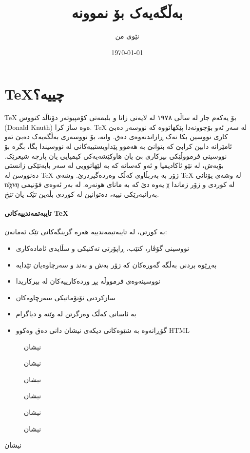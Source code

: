 \documentclass{article}
\title{بەڵگەیەک بۆ نموونە}
\author{نێوی من}
\date{\today}
\begin{document}
\maketitle

\section{\TeX چییە؟}

\TeX{} بۆ یەکەم جار لە ساڵی ١٩٧٨ لە لایەنی زانا و بلیمەتی کۆمپیوتەر
دۆناڵد کنووس (Donald Knuth) ەوە ساز کرا. \TeX{} لە سەر ئەو بۆچوونەدا
پێکهاتووە کە نووسەر دەبێ کاری نووسین بکا نەک ڕازاندنەوەی دەق. واتە، بۆ
نووسەری بەڵگەیەک دەبێ ئەو ئامێرانە دابین کرابێ کە بتوانێ بە هەموو
پێداویستییەکانی لە نووسیندا بگا، بگرە بۆ نووسینی فرمووڵێکی بیرکاری بێ
یان هاوکێشەیەکی کیمیایی یان پارچە شیعرێک. بۆیەش، لە نێو ئاکادیمیا و ئەو
کەسانه کە بە لێهاتوویی لە سەر بابەتێکی زانستی دەنووسن لە \TeX{} زۆر بە
بەربڵاوی کەڵک وەردەگیردرێ. وشەی \TeX{} لە وشەی یۆنانی \textit{τέχνη}
یەوە دێ کە بە مانای هونەرە. لە بەر ئەوەی فۆنیمی χ لە کوردی و زۆر زماندا
بەرانبەرێکی نییە، دەتوانین لە کوردی بڵەین \textit{تێک} یان
\textit{تێخ}.

\paragraph{تایبەتمەندییەکانی \TeX} بە کورتی، لە تایبەتیمەندییە هەرە
گرینگەکانی تێک ئەمانەن:
 
\begin{itemize}
\item نووسینی گۆڤار، کتێب، ڕاپۆرتی تەکنیکی و سڵایدی ئامادەکاری
\item بەڕێوە بردنی بەڵگە گەورەکان کە زۆر بەش و بەند و سەرچاوەیان تێدایە
\item نووسینەوەی فرمووڵە پڕ وردەکارییەکان لە بیرکاریدا
\item سازکردنی ئۆتۆماتیکی سەرچاوەکان
\item بە ئاسانی کەڵک وەرگرتن لە وێنە و دیاگرام
\item گۆڕانەوە بە شێوەکانی دیکەی نیشان دانی دەق وەکوو HTML
\end{itemize}


\begin{figure}
\caption{نیشان}
\end{figure}

\begin{figure}
\caption{نیشان}
\end{figure}
\begin{figure}
\caption{نیشان}
\end{figure}
\begin{figure}
\caption{نیشان}
\end{figure}
\begin{figure}
\caption{نیشان}
\end{figure}
\begin{figure}
\caption{نیشان}
\end{figure}
\begin{table}
\caption{نیشان}
\end{table}
\end{document}
